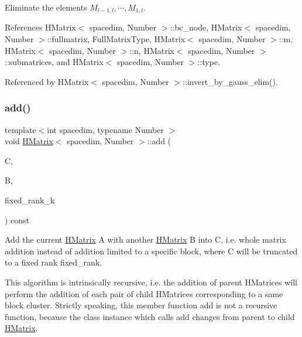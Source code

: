 Eliminate the elements $M_{l-1,l}, \cdots, M_{1,l}$.

References H\+Matrix$<$ spacedim, Number $>$\+::bc\+\_\+node, H\+Matrix$<$ spacedim, Number $>$\+::fullmatrix, Full\+Matrix\+Type, H\+Matrix$<$ spacedim, Number $>$\+::m, H\+Matrix$<$ spacedim, Number $>$\+::n, H\+Matrix$<$ spacedim, Number $>$\+::submatrices, and H\+Matrix$<$ spacedim, Number $>$\+::type.



Referenced by H\+Matrix$<$ spacedim, Number $>$\+::invert\+\_\+by\+\_\+gauss\+\_\+elim().

\mbox{\label{classHMatrix_a8f96186426cd3147d5af32ca84ad25ea}} 
\subsubsection{\texorpdfstring{add()}{add()}\hspace{0.1cm}{\footnotesize\ttfamily [1/10]}}
{\footnotesize\ttfamily template$<$int spacedim, typename Number $>$ \\
void \hyperlink{classHMatrix}{H\+Matrix}$<$ spacedim, Number $>$\+::add (\begin{DoxyParamCaption}\item[{\hyperlink{classHMatrix}{H\+Matrix}$<$ spacedim, Number $>$ \&}]{C,  }\item[{const \hyperlink{classHMatrix}{H\+Matrix}$<$ spacedim, Number $>$ \&}]{B,  }\item[{const \hyperlink{classHMatrix_a5ca8dc549783d38371a01ecd621ecb34}{size\+\_\+type}}]{fixed\+\_\+rank\+\_\+k }\end{DoxyParamCaption}) const}

Add the current \hyperlink{classHMatrix}{H\+Matrix} {\ttfamily A} with another \hyperlink{classHMatrix}{H\+Matrix} {\ttfamily B} into {\ttfamily C}, i.\+e. whole matrix addition instead of addition limited to a specific block, where {\ttfamily C} will be truncated to a fixed rank {\ttfamily fixed\+\_\+rank}.

This algorithm is intrinsically recursive, i.\+e. the addition of parent H\+Matrices will perform the addition of each pair of child H\+Matrices corresponding to a same block cluster. Strictly speaking, this member function {\ttfamily add} is not a recursive function, because the class instance which calls {\ttfamily add} changes from parent to child \hyperlink{classHMatrix}{H\+Matrix}.

